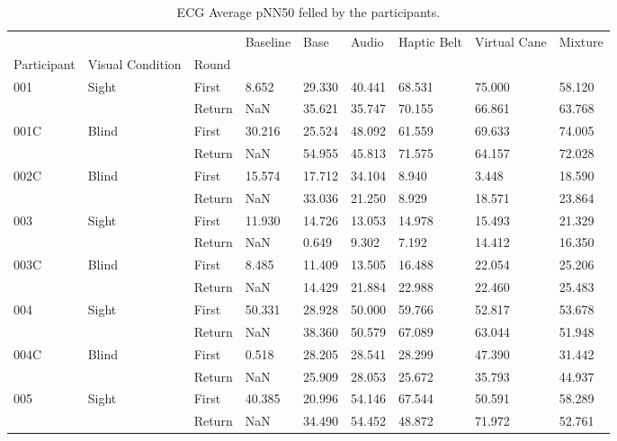 
\begin{table}[!htb]
\centering
\caption{ECG Average pNN50 felled by the participants.}
\label{tab:ecg_pnn50_table}
\begin{tabular}{lllllllll}
\toprule
    &       &        &  Baseline &   Base &  Audio &  Haptic Belt &  Virtual Cane &  Mixture \\
Participant & Visual Condition & Round &           &        &        &              &               &          \\
\midrule
001 & Sight & First &     8.652 & 29.330 & 40.441 &       68.531 &        75.000 &   58.120 \\
    &       & Return &       NaN & 35.621 & 35.747 &       70.155 &        66.861 &   63.768 \\
001C & Blind & First &    30.216 & 25.524 & 48.092 &       61.559 &        69.633 &   74.005 \\
    &       & Return &       NaN & 54.955 & 45.813 &       71.575 &        64.157 &   72.028 \\
002C & Blind & First &    15.574 & 17.712 & 34.104 &        8.940 &         3.448 &   18.590 \\
    &       & Return &       NaN & 33.036 & 21.250 &        8.929 &        18.571 &   23.864 \\
003 & Sight & First &    11.930 & 14.726 & 13.053 &       14.978 &        15.493 &   21.329 \\
    &       & Return &       NaN &  0.649 &  9.302 &        7.192 &        14.412 &   16.350 \\
003C & Blind & First &     8.485 & 11.409 & 13.505 &       16.488 &        22.054 &   25.206 \\
    &       & Return &       NaN & 14.429 & 21.884 &       22.988 &        22.460 &   25.483 \\
004 & Sight & First &    50.331 & 28.928 & 50.000 &       59.766 &        52.817 &   53.678 \\
    &       & Return &       NaN & 38.360 & 50.579 &       67.089 &        63.044 &   51.948 \\
004C & Blind & First &     0.518 & 28.205 & 28.541 &       28.299 &        47.390 &   31.442 \\
    &       & Return &       NaN & 25.909 & 28.053 &       25.672 &        35.793 &   44.937 \\
005 & Sight & First &    40.385 & 20.996 & 54.146 &       67.544 &        50.591 &   58.289 \\
    &       & Return &       NaN & 34.490 & 54.452 &       48.872 &        71.972 &   52.761 \\
\bottomrule
\end{tabular}
\end{table}

